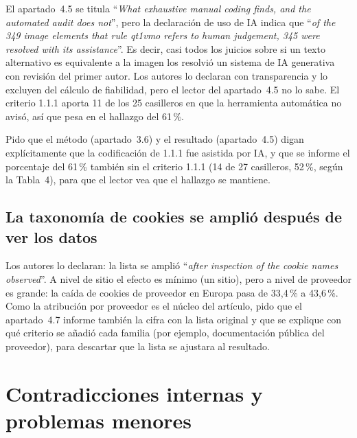 \documentclass[11pt,a4paper]{article}
\newcommand{\cita}[1]{``\textit{#1}''}
\begin{document}
El apartado~4.5 se titula \cita{What exhaustive manual coding finds, and the automated audit does not}, pero la declaraci\'on de uso de IA indica que \cita{of the 349 image elements that rule qt1vmo refers to human judgement, 345 were resolved with its assistance}. Es decir, casi todos los juicios sobre si un texto alternativo es equivalente a la imagen los resolvi\'o un sistema de IA generativa con revisi\'on del primer autor. Los autores lo declaran con transparencia y lo excluyen del c\'alculo de fiabilidad, pero el lector del apartado~4.5 no lo sabe. El criterio 1.1.1 aporta 11 de los 25 casilleros en que la herramienta autom\'atica no avis\'o, as\'i que pesa en el hallazgo del 61\,\%.

Pido que el m\'etodo (apartado~3.6) y el resultado (apartado~4.5) digan expl\'icitamente que la codificaci\'on de 1.1.1 fue asistida por IA, y que se informe el porcentaje del 61\,\% tambi\'en sin el criterio 1.1.1 (14 de 27 casilleros, 52\,\%, seg\'un la Tabla~4), para que el lector vea que el hallazgo se mantiene.

\subsection{La taxonom\'ia de cookies se ampli\'o despu\'es de ver los datos}

Los autores lo declaran: la lista se ampli\'o \cita{after inspection of the cookie names observed}. A nivel de sitio el efecto es m\'inimo (un sitio), pero a nivel de proveedor es grande: la ca\'ida de cookies de proveedor en Europa pasa de 33{,}4\,\% a 43{,}6\,\%. Como la atribuci\'on por proveedor es el n\'ucleo del art\'iculo, pido que el apartado~4.7 informe tambi\'en la cifra con la lista original y que se explique con qu\'e criterio se a\~nadi\'o cada familia (por ejemplo, documentaci\'on p\'ublica del proveedor), para descartar que la lista se ajustara al resultado.

\section{Contradicciones internas y problemas menores}\label{sec:incoherencias}
\end{document}

